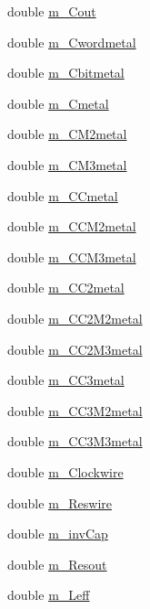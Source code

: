\begin{DoxyCompactItemize}
\item 
double \hyperlink{classTechParameter_a64369670fd2b848123d9238c40c102f6}{m\_\-Cout}
\item 
double \hyperlink{classTechParameter_af505916665893c6055f82e5319d1b1e6}{m\_\-Cwordmetal}
\item 
double \hyperlink{classTechParameter_a5c15619e7266048330592ec431fd1749}{m\_\-Cbitmetal}
\item 
double \hyperlink{classTechParameter_a6b4afa4c0a69794d1ffb60e98b1be4fb}{m\_\-Cmetal}
\item 
double \hyperlink{classTechParameter_a20d14f5ecd921eeee08ca20dcee091bf}{m\_\-CM2metal}
\item 
double \hyperlink{classTechParameter_a748f52c33d1ae8de69cafd97beb29444}{m\_\-CM3metal}
\item 
double \hyperlink{classTechParameter_a5609f0f3502fccf54d1ee2a5b8209de1}{m\_\-CCmetal}
\item 
double \hyperlink{classTechParameter_addbe51ebba3df6d9c956db4ea70e8378}{m\_\-CCM2metal}
\item 
double \hyperlink{classTechParameter_a86d86d7add2df32fd168b8d7e3d63a6f}{m\_\-CCM3metal}
\item 
double \hyperlink{classTechParameter_ae881f7215a3fc1c5a22a8908b26fe985}{m\_\-CC2metal}
\item 
double \hyperlink{classTechParameter_a00c60e0c3785c721138d70584dcf8614}{m\_\-CC2M2metal}
\item 
double \hyperlink{classTechParameter_a7c79328a4b5c1329b6dca1408e6aed6c}{m\_\-CC2M3metal}
\item 
double \hyperlink{classTechParameter_a57e5d2b2128451c9957b6eff0cc736c8}{m\_\-CC3metal}
\item 
double \hyperlink{classTechParameter_aba663d9a459017c87d2d0c76e4497748}{m\_\-CC3M2metal}
\item 
double \hyperlink{classTechParameter_a6872396510de2c85aeaac0c98cac8ef4}{m\_\-CC3M3metal}
\item 
double \hyperlink{classTechParameter_a13387c7e88c15c06926fc602eca9f7b5}{m\_\-Clockwire}
\item 
double \hyperlink{classTechParameter_aae7fb632ceb1bc7972c834874ef119b1}{m\_\-Reswire}
\item 
double \hyperlink{classTechParameter_a25c7bf5ec662dd59a8bc2529bf3302c9}{m\_\-invCap}
\item 
double \hyperlink{classTechParameter_aeaa37cc51f02cba07dc5006495eac630}{m\_\-Resout}
\item 
double \hyperlink{classTechParameter_a6160a78f26d020cfb71a03ec8265a45b}{m\_\-Leff}

\end{DoxyCompactItemize}
